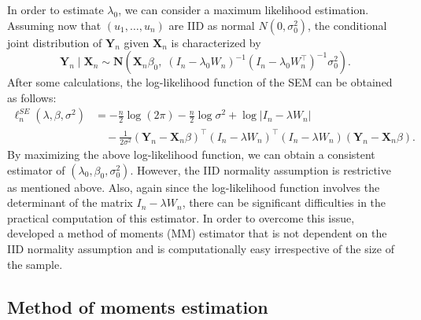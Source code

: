 \documentclass[10.5pt, A4paper, openany, uplatex]{book}
\newcommand{\mbf}{\mathbf}
\numberwithin{equation}{section}
\begin{document}
In order to estimate $\lambda_0$, we can consider a maximum likelihood estimation.
Assuming now that $(u_1, \ldots , u_n)$ are IID as normal $N(0, \sigma_0^2)$, the conditional joint distribution of $\mbf{Y}_n$  given $\mbf{X}_n$ is characterized by
\[
	\mbf{Y}_n \mid \mbf{X}_n \sim \mbf{N}\left(\mbf{X}_n \beta_0, \; (I_n - \lambda_0 W_n)^{-1}(I_n - \lambda_0 W_n^\top)^{-1}\sigma^2_0 \right).
\]
After some calculations, the log-likelihood function of the SEM can be obtained as follows:
\begin{align*}
	\ell^{SE}_n(\lambda, \beta, \sigma^2) 
	& = -\frac{n}{2} \log (2\pi) -\frac{n}{2} \log\sigma^2 + \log | I_n - \lambda W_n| \\
	& \quad - \frac{1}{2\sigma^2} (\mbf{Y}_n - \mbf{X}_n \beta)^\top(I_n - \lambda W_n)^\top (I_n - \lambda W_n) (\mbf{Y}_n  - \mbf{X}_n \beta).
\end{align*}
By maximizing the above log-likelihood function, we can obtain a consistent estimator of $(\lambda_0, \beta_0, \sigma^2_0)$.
However, the IID normality assumption is restrictive as mentioned above.
Also, again since the log-likelihood function involves the determinant of the matrix $I_n - \lambda W_n$, there can be significant difficulties in the practical computation of this estimator.
In order to overcome this issue, \cite{kelejian1999generalized} developed a method of moments (MM) estimator that is not dependent on the IID normality assumption and is computationally easy irrespective of the size of the sample.

\subsection{Method of moments estimation}\label{subsec:mm}
\end{document}
